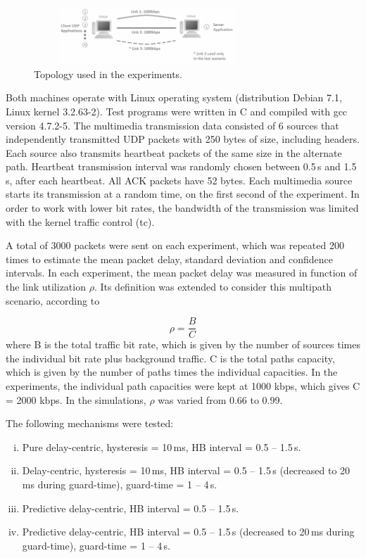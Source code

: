 \documentclass[letterpaper,10pt,oneside,conference,final]{sbrt2015}
\begin{document}
\begin{figure}[h!]
\centering
\includegraphics[width=8.5cm, height=2.2cm]{figura1}
\caption{Topology used in the experiments.}
\label{topology}
\end{figure}

Both machines operate with Linux operating system (distribution Debian 7.1, Linux kernel 3.2.63-2). Test programs were written in C and compiled with gcc version 4.7.2-5. The multimedia transmission data consisted of 6 sources that independently transmitted UDP packets with 250 bytes of size, including headers. Each source also transmits heartbeat packets of the same size in the alternate path. Heartbeat transmission interval was randomly chosen between 0.5\,s and 1.5\,s, after each heartbeat. All ACK packets have 52 bytes. Each multimedia source starts its transmission at a random time, on the first second of the experiment. In order to work with lower bit rates, the bandwidth of the transmission was limited with the kernel traffic control (tc). 

A total of 3000 packets were sent on each experiment, which was repeated 200 times to estimate the mean packet delay, standard deviation and confidence intervals. In each experiment, the mean packet delay was measured in function of the link utilization $\rho$. Its definition was extended to consider this multipath scenario, according to 

\begin{equation}
 \rho = \frac{B}{C}
\end{equation}
where B is the total traffic bit rate, which is given by the number of sources times the individual bit rate plus background traffic. C is the total paths capacity, which is given by the number of paths times the individual capacities. In the experiments, the individual path capacities were kept at 1000 kbps, which gives C = 2000 kbps. In the simulations, $\rho$ was varied from 0.66 to 0.99. 

The following mechanisms were tested:
\begin{enumerate}[i)]
 \item Pure delay-centric, hysteresis = 10\,ms, HB interval = 0.5 -- 1.5\,s.
 \item Delay-centric, hysteresis = 10\,ms, HB interval = 0.5 -- 1.5\,s (decreased to 20\,ms during guard-time), guard-time = 1 -- 4\,s. 
 \item Predictive delay-centric, HB interval = 0.5 -- 1.5\,s.
 \item Predictive delay-centric, HB interval = 0.5 -- 1.5\,s (decreased to 20\,ms during guard-time), guard-time = 1 -- 4\,s.
\end{enumerate}
\end{document}
